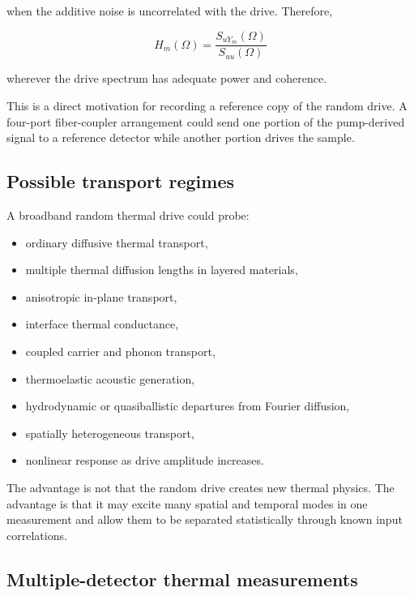 \documentclass[11pt,letterpaper]{article}
\begin{document}
when the additive noise is uncorrelated with the drive. Therefore,

\begin{equation}
    \boxed{
    H_m(\Omega)
    =
    \frac{
    S_{uY_m}(\Omega)
    }{
    S_{uu}(\Omega)
    }
    }
    \label{eq:transfer_estimator}
\end{equation}

wherever the drive spectrum has adequate power and coherence.

This is a direct motivation for recording a reference copy of the random
drive. A four-port fiber-coupler arrangement could send one portion of the
pump-derived signal to a reference detector while another portion drives
the sample.

\subsection{Possible transport regimes}

A broadband random thermal drive could probe:

\begin{itemize}[leftmargin=2em]
    \item ordinary diffusive thermal transport,
    \item multiple thermal diffusion lengths in layered materials,
    \item anisotropic in-plane transport,
    \item interface thermal conductance,
    \item coupled carrier and phonon transport,
    \item thermoelastic acoustic generation,
    \item hydrodynamic or quasiballistic departures from Fourier diffusion,
    \item spatially heterogeneous transport,
    \item nonlinear response as drive amplitude increases.
\end{itemize}

The advantage is not that the random drive creates new thermal physics. The
advantage is that it may excite many spatial and temporal modes in one
measurement and allow them to be separated statistically through known
input correlations.

\subsection{Multiple-detector thermal measurements}
\end{document}
